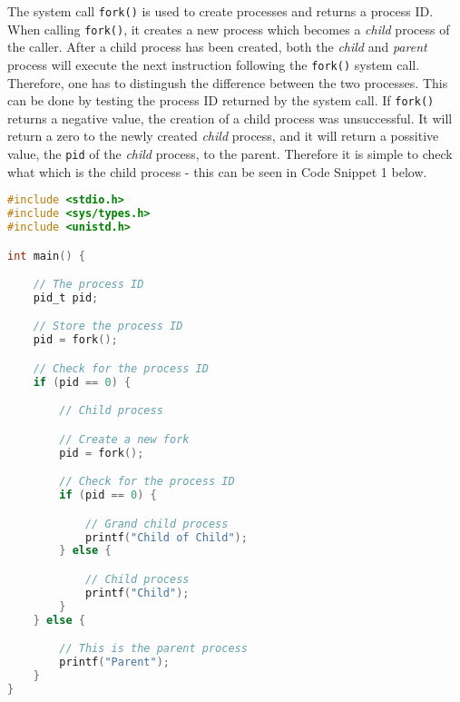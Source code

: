 \documentclass[a4paper,oneside,onecolumn]{article}
\newcommand{\code}[1]{\colorbox{codegray}{\texttt{#1}}}
\begin{document}
\noindent
The system call \code{fork()} is used to create processes and returns a process ID. When calling \code{fork()}, it creates a new process which becomes a \textit{child} process of the caller. After a child process has been created, both the \textit{child} and \textit{parent} process will execute the next instruction following the \code{fork()} system call. Therefore, one has to distingush the difference between the two processes.
\newline
This can be done by testing the process ID returned by the system call.
\newline
\newline
If \code{fork()} returns a negative value, the creation of a child process was unsuccessful. It will return a zero to the newly created \textit{child} process, and it will return a possitive value, the \texttt{pid} of the \textit{child} process, to the parent.
\newline
\newline
Therefore it is simple to check what which is the child process - this can be seen in Code Snippet 1 below.
\begin{lstlisting}[language=c, caption=Managing system calls]
#include <stdio.h>
#include <sys/types.h>
#include <unistd.h>

int main() {

    // The process ID
    pid_t pid;

    // Store the process ID
    pid = fork();

    // Check for the process ID
    if (pid == 0) {

        // Child process

        // Create a new fork
        pid = fork();

        // Check for the process ID
        if (pid == 0) {

            // Grand child process
            printf("Child of Child");
        } else {

            // Child process
            printf("Child");
        }
    } else {

        // This is the parent process
        printf("Parent");
    }
}
\end{lstlisting}
\end{document}

